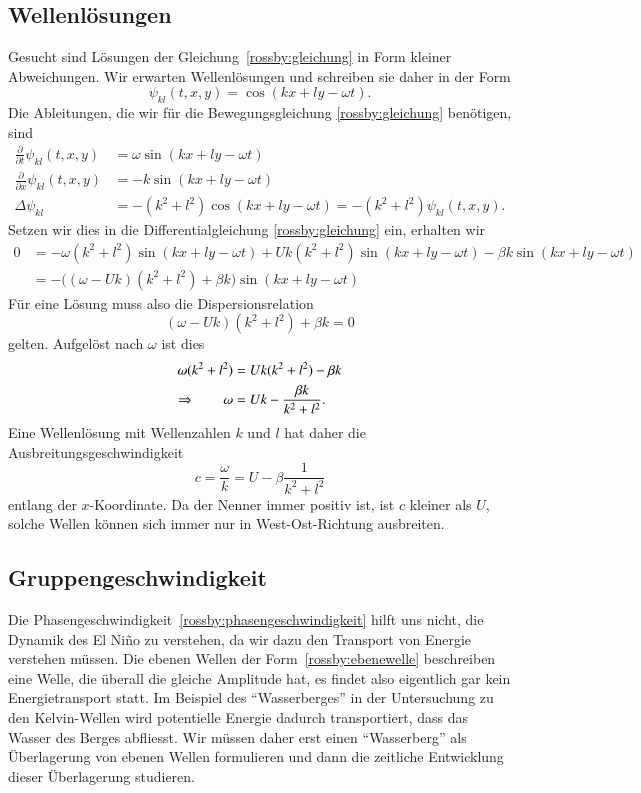 \subsection{Wellenlösungen\label{subsection:rossby:loesungen}}
Gesucht sind Lösungen der Gleichung~\eqref{rossby:gleichung}
in Form kleiner Abweichungen.
Wir erwarten Wellenlösungen und schreiben sie daher in der Form
\begin{equation}
\psi_{kl}(t,x,y)
=
\cos(kx+ly-\omega t).
\label{rossby:ebenewelle}
\end{equation}
Die Ableitungen, die wir für die Bewegungsgleichung
\eqref{rossby:gleichung} benötigen, sind
\begin{align*}
\frac{\partial}{\partial t} \psi_{kl}(t,x,y)
&=
\omega \sin(kx+ly-\omega t)
\\
\frac{\partial}{\partial x} \psi_{kl}(t,x,y)
&=
-k
\sin(kx+ly-\omega t)
\\
\Delta\psi_{kl}
&=
-(k^2+l^2)\cos(kx+ly-\omega t)=-(k^2+l^2)\psi_{kl}(t,x,y).
\end{align*}
Setzen wir dies in die Differentialgleichung
\eqref{rossby:gleichung}
ein, erhalten wir 
\begin{align*}
0
&=
-
\omega(k^2+l^2) 
\sin(kx+ly-\omega t)
+
Uk(k^2+l^2)
\sin(kx+ly-\omega t)
-
\beta k
\sin(kx+ly-\omega t)
\\
&=
-\bigl((\omega-Uk)(k^2+l^2)+\beta k\bigr)
\sin(kx+ly-\omega t)
\end{align*}
Für eine Lösung muss also die Dispersionsrelation
\[
(\omega -Uk)(k^2+l^2) +\beta k=0
\]
gelten.
Aufgelöst nach $\omega$ ist dies
\begin{align}
\omega(k^2+l^2)
&=
Uk(k^2+l^2) -\beta k
\notag
\\
\Rightarrow\qquad
\omega
&=
Uk
-
\frac{\beta k}{k^2+l^2}.
\label{rossby:dispersion}
\end{align}
Eine Wellenlösung mit Wellenzahlen $k$ und $l$ hat daher 
die Ausbreitungsgeschwindigkeit 
\begin{equation}
c=\frac{\omega}{k} = U-\beta\frac{1}{k^2+l^2}
\label{rossby:phasengeschwindigkeit}
\end{equation}
entlang der $x$-Koordinate.
Da der Nenner immer positiv ist, ist $c$ kleiner als $U$, solche
Wellen können sich immer nur in West-Ost-Richtung ausbreiten.

\subsection{Gruppengeschwindigkeit}
Die Phasengeschwindigkeit~\eqref{rossby:phasengeschwindigkeit}
hilft uns nicht, die Dynamik des El Niño zu verstehen, da wir dazu
den Transport von Energie verstehen müssen.
Die ebenen Wellen der Form~\eqref{rossby:ebenewelle} beschreiben eine Welle,
die überall die gleiche Amplitude hat, es findet also eigentlich gar
kein Energietransport statt.
Im Beispiel des ``Wasserberges'' in der Untersuchung zu den Kelvin-Wellen
wird potentielle Energie dadurch transportiert, dass das Wasser des Berges
abfliesst.
Wir müssen daher erst einen ``Wasserberg'' als Überlagerung von 
ebenen Wellen formulieren und dann die zeitliche Entwicklung dieser
Überlagerung studieren.

